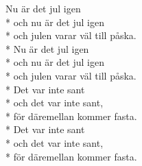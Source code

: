 \begin{SongText}
    \begin{SongVerse}
        Nu är det jul igen\\*%
        och nu är det jul igen\\*%
        och julen varar väl till påska.\\*%
        Nu är det jul igen\\*%
        och nu är det jul igen\\*%
        och julen varar väl till påska.\\*%
        Det var inte sant\\*%
        och det var inte sant,\\*%
        för däremellan kommer fasta.\\*%
        Det var inte sant\\*%
        och det var inte sant,\\*%
        för däremellan kommer fasta.
    \end{SongVerse}
\end{SongText}